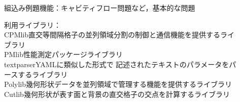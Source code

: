 \begin{description}
\item[ ] 組込み例題機能：キャビティフロー問題など，基本的な問題
\item[ ] 利用ライブラリ：\\
\qquad CPMlib\quad 直交等間隔格子の並列領域分割の制御と通信機能を提供するライブラリ\\
\qquad PMlib\quad 性能測定パッケージライブラリ \\
\qquad textparser\quad YAMLに類似した形式で 記述されたテキストのパラメータをパースするライブラリ\\
\qquad Polylib\quad 幾何形状データを並列領域で管理する機能を提供するライブラリ\\
\qquad Cutlib\quad 幾何形状が表す面と背景の直交格子の交点を計算するライブラリ\\
\end{description}

